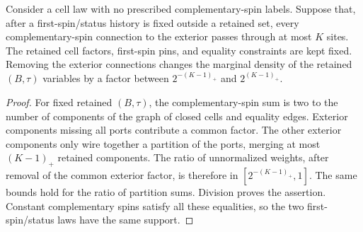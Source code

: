 \begin{lemma}\label{annulus:ports}
Consider a cell law with no prescribed complementary-spin labels.
Suppose that, after a first-spin/status history is fixed outside a
retained set, every complementary-spin connection to the exterior passes
through at most $K$ sites.  The retained cell factors, first-spin pins,
and equality constraints are kept fixed.  Removing the exterior
connections changes the marginal density of the retained $(B,\tau)$
variables by a factor between $2^{-(K-1)_+}$ and $2^{(K-1)_+}$.
\end{lemma}
\begin{proof}
For fixed retained $(B,\tau)$, the complementary-spin sum is two to the
number of components of the graph of closed cells and equality edges.
Exterior components missing all ports contribute a common factor.
The other exterior components only wire together a partition of the
ports, merging at most $(K-1)_+$ retained components.  The ratio of
unnormalized weights, after removal of the common exterior factor, is
therefore in $[2^{-(K-1)_+},1]$.  The same bounds hold for the ratio of
partition sums.  Division proves the assertion.  Constant complementary
spins satisfy all these equalities, so the two first-spin/status laws
have the same support.
\end{proof}

